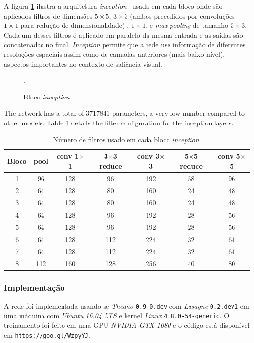 \documentclass[11pt]{article}
\newcommand{\tit}[1]{\textit{#1}}
\begin{document}
A figura \ref{fig:newinception} ilustra a arquitetura
\tit{inception}~\cite{szegedy_2014}
usada em cada bloco onde são aplicados
filtros de dimensões $5 \times 5$, $3 \times 3$
(ambos precedidos por convoluções $1\times 1$ para redução de dimensionalidade)
, $1 \times 1$, e \tit{max-pooling} de tamanho $3 \times 3$.
Cada um desses filtros é aplicado em paralelo da mesma entrada e as saídas
são concatenadas no final.
\tit{Inception} permite que a rede use informação de diferentes resoluções
espaciais assim como de camadas anteriores (mais baixo nível),
aspectos importantes no contexto de saliência visual.

\begin{figure}[H]
    \centering
    \def\svgwidth{0.57\linewidth}
    
    \caption{Bloco \tit{inception}}.
   \label{fig:newinception}
\end{figure}

The network has a total of $3717841$ parameters, a very low number
compared to other models. Table \ref{table:inception} details the filter configuration for the inception layers.

\begin{table}[H]
\centering
	\small
\label{table:inception}
\caption{Número de filtros usado em cada bloco \tit{inception}.}
\begin{tabular}{|c|c|c|c|c|c|c|}
	\hline
    Bloco & pool & conv 1$\times$1 & 3$\times$3 reduce &
    conv 3$\times$3 & 5$\times$5 reduce & conv 5$\times$5\\
    \hline
    1 & 96 & 128 & 96 & 192 & 58 & 96\\
    \hline
    2 & 64 & 128 & 80 & 160 & 24 & 48\\
    \hline
    3 & 64 & 128 & 80 & 160 & 24 & 48\\
    \hline
    4 & 64 & 128 & 96 & 192 & 28 & 56\\
    \hline
    5 & 64 & 128 & 96 & 192 & 28 & 56\\
    \hline
    6 & 64 & 128 & 112 & 224 & 32 & 64\\
    \hline
    7 & 64 & 128 & 112 & 224 & 32 & 64\\
    \hline
    8 & 112 & 160 & 128 & 256 & 40 & 80\\
    \hline
\end{tabular}
\end{table}

\subsubsection{Implementação}
A rede foi implementada usando-se \emph{Theano} \texttt{0.9.0.dev}
com \emph{Lasagne} \texttt{0.2.dev1}
em uma máquina com \emph{Ubuntu 16.04 LTS} e
kernel \emph{Linux} \texttt{4.8.0-54-generic}.
O treinamento foi feito em uma GPU \emph{NVIDIA GTX 1080} e o código está
disponível em \texttt{https://goo.gl/WzpyYJ}.
\end{document}
